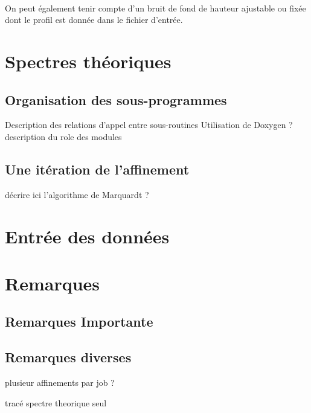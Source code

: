 \documentclass[a4paper]{article}
\begin{document}
\paragraph{}
On peut également tenir compte d'un bruit de fond de hauteur ajustable ou fixée dont le profil est donnée dans le fichier d'entrée.
\newpage
\tableofcontents
\newpage
\section{Spectres théoriques}

\FloatBarrier

\FloatBarrier

\newpage
\subsection{Organisation des sous-programmes}
Description des relations d'appel entre sous-routines 
Utilisation de Doxygen ?
description du role des modules

\subsection{Une itération de l'affinement}
décrire ici l'algorithme de Marquardt ?
\section{Entrée des données}



\section{Remarques}
\subsection{Remarques Importante}

\subsection{Remarques diverses}
plusieur affinements par job ?

tracé spectre theorique seul
\end{document}

